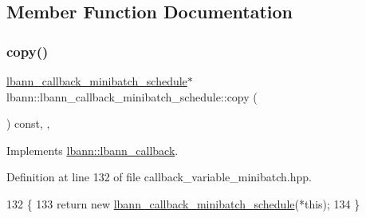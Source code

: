 \subsection{Member Function Documentation}
\mbox{\label{classlbann_1_1lbann__callback__minibatch__schedule_ad815c5e84280c71cc57c7cb6c9a8c73b}} 
\subsubsection{\texorpdfstring{copy()}{copy()}}
{\footnotesize\ttfamily \hyperlink{classlbann_1_1lbann__callback__minibatch__schedule}{lbann\+\_\+callback\+\_\+minibatch\+\_\+schedule}$\ast$ lbann\+::lbann\+\_\+callback\+\_\+minibatch\+\_\+schedule\+::copy (\begin{DoxyParamCaption}{ }\end{DoxyParamCaption}) const\hspace{0.3cm}{\ttfamily [inline]}, {\ttfamily [override]}, {\ttfamily [virtual]}}



Implements \hyperlink{classlbann_1_1lbann__callback_a9f545d1269a8c7af335625d049691f26}{lbann\+::lbann\+\_\+callback}.



Definition at line 132 of file callback\+\_\+variable\+\_\+minibatch.\+hpp.


\begin{DoxyCode}
132                                                            \{
133     \textcolor{keywordflow}{return} \textcolor{keyword}{new} \hyperlink{classlbann_1_1lbann__callback__minibatch__schedule_adceb97a2732247213fd25b3f1e824105}{lbann\_callback\_minibatch\_schedule}(*\textcolor{keyword}{this});
134   \}
\end{DoxyCode}
\mbox{\label{classlbann_1_1lbann__callback__minibatch__schedule_a2bb62cf45d2f7417cddcf79843ce3e2b}} 
